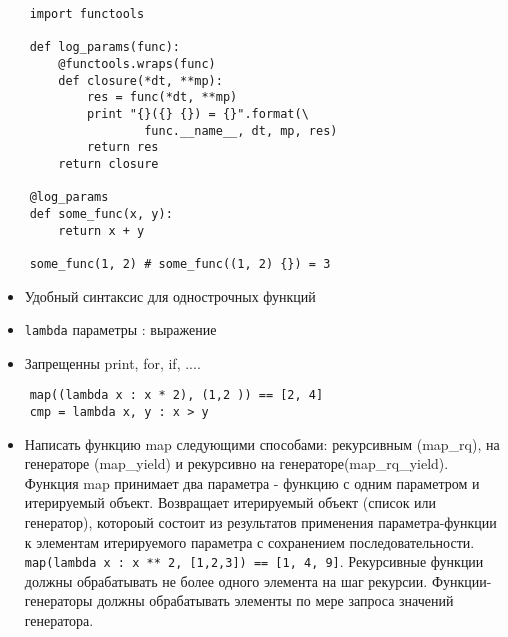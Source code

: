 \documentclass{article}
\begin{document}
\vspace{15pt}
\begin{lstlisting}
	import functools

	def log_params(func):
		@functools.wraps(func)
		def closure(*dt, **mp):
			res = func(*dt, **mp)
			print "{}({} {}) = {}".format(\
					func.__name__, dt, mp, res)
			return res
		return closure

	@log_params
	def some_func(x, y):
		return x + y

	some_func(1, 2) # some_func((1, 2) {}) = 3
\end{lstlisting}
\newpage

\begin{itemize}
	\item Удобный синтаксис для однострочных функций
	\item \lstinline!lambda! параметры : выражение
	\item Запрещенны print, for, if, ....
\end{itemize}
\vspace{15pt}
\begin{lstlisting}
	map((lambda x : x * 2), (1,2 )) == [2, 4]
	cmp = lambda x, y : x > y
\end{lstlisting}
\newpage

\newpage

\center{AA}
\begin{itemize}
	\item Написать функцию map следующими способами: рекурсивным (map\_rq), 
		на генераторе (map\_yield) и рекурсивно на генераторе(map\_rq\_yield).
		Функция map принимает два параметра - функцию с одним параметром и итерируемый объект. 
		Возвращает итерируемый объект (список или генератор), котороый состоит из результатов
		применения параметра-функции к элементам итерируемого параметра с сохранением последовательности.
		\lstinline!map(lambda x : x ** 2, [1,2,3]) == [1, 4, 9]!.
		Рекурсивные функции должны обрабатывать не более одного элемента на шаг рекурсии.
		Функции-генераторы должны обрабатывать элементы по мере запроса значений генератора.
\end{itemize}
\newpage
\end{document}
